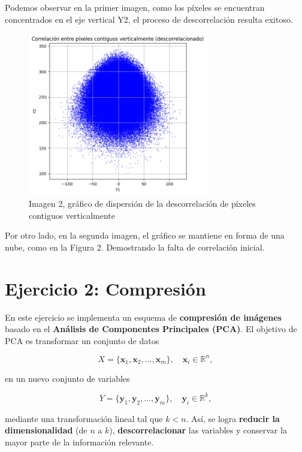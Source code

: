 \documentclass[a4paper,12pt]{article}
\numberwithin{equation}{section}
\numberwithin{figure}{section}
\begin{document}
Podemos observar en la primer imagen, como los píxeles se encuentran concentrados en el eje vertical Y2, el proceso de descorrelación resulta exitoso.

\begin{figure}[H]
    \centering
    \includegraphics[width=0.7\textwidth]{Ejercicio1d.png}
    \caption{Imagen 2, gráfico de dispersión de la descorrelación de píxeles contiguos verticalmente}
    \label{fig:descorrelacion2}
\end{figure}

Por otro lado, en la segunda imagen, el gráfico se mantiene en forma de una nube, como en la Figura 2. Demostrando la falta de correlación inicial.

\section {Ejercicio 2: Compresión}

En este ejercicio se implementa un esquema de \textbf{compresión de imágenes} basado en el \textbf{Análisis de Componentes Principales (PCA)}. El objetivo de PCA es transformar un conjunto de datos

\[
X = \{\mathbf{x}_1, \mathbf{x}_2, \dots, \mathbf{x}_m\}, \quad \mathbf{x}_i \in \mathbb{R}^n,
\]

en un nuevo conjunto de variables

\[
Y = \{\mathbf{y}_1, \mathbf{y}_2, \dots, \mathbf{y}_m\}, \quad \mathbf{y}_i \in \mathbb{R}^k,
\]

mediante una transformación lineal tal que \(k < n\). Así, se logra \textbf{reducir la dimensionalidad} (de \(n\) a \(k\)), \textbf{descorrelacionar} las variables y conservar la mayor parte de la información relevante.
\end{document}
